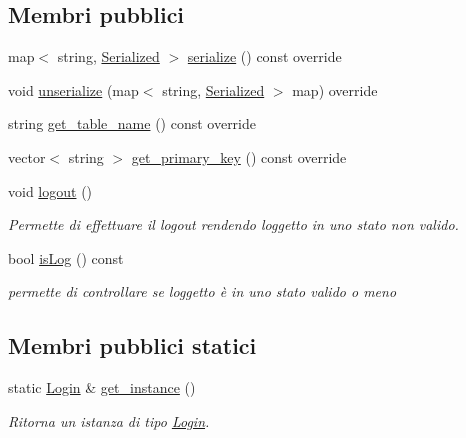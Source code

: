 \subsection*{Membri pubblici}
\begin{DoxyCompactItemize}
\item 
map$<$ string, \mbox{\hyperlink{structmm_1_1_serialized}{Serialized}} $>$ \mbox{\hyperlink{structmm_1_1model_1_1authentication_1_1_login_a69ec1a769ef1659b8ed39d5e23c24333}{serialize}} () const override
\item 
void \mbox{\hyperlink{structmm_1_1model_1_1authentication_1_1_login_ac2429ce08624b0c425feced836b77d62}{unserialize}} (map$<$ string, \mbox{\hyperlink{structmm_1_1_serialized}{Serialized}} $>$ map) override
\item 
string \mbox{\hyperlink{structmm_1_1model_1_1authentication_1_1_login_afc72adef91be3d97ce4751b8a2357613}{get\+\_\+table\+\_\+name}} () const override
\item 
vector$<$ string $>$ \mbox{\hyperlink{structmm_1_1model_1_1authentication_1_1_login_a56f5da26be2d64baa78d0c81d99c8221}{get\+\_\+primary\+\_\+key}} () const override
\item 
void \mbox{\hyperlink{structmm_1_1model_1_1authentication_1_1_login_a23843b088a1c1e0a668e9013ca6768ad}{logout}} ()
\begin{DoxyCompactList}\small\item\em Permette di effettuare il logout rendendo l\textquotesingle{}oggetto in uno stato non valido. \end{DoxyCompactList}\item 
bool \mbox{\hyperlink{structmm_1_1model_1_1authentication_1_1_login_aec29ca0fab75c7691c7939970646b39b}{is\+Log}} () const
\begin{DoxyCompactList}\small\item\em permette di controllare se l\textquotesingle{}oggetto è in uno stato valido o meno \end{DoxyCompactList}\end{DoxyCompactItemize}
\subsection*{Membri pubblici statici}
\begin{DoxyCompactItemize}
\item 
static \mbox{\hyperlink{structmm_1_1model_1_1authentication_1_1_login}{Login}} \& \mbox{\hyperlink{structmm_1_1model_1_1authentication_1_1_login_a37112a637ed012c96a96c5a2366f4220}{get\+\_\+instance}} ()
\begin{DoxyCompactList}\small\item\em Ritorna un istanza di tipo \mbox{\hyperlink{structmm_1_1model_1_1authentication_1_1_login}{Login}}. \end{DoxyCompactList}\end{DoxyCompactItemize}
